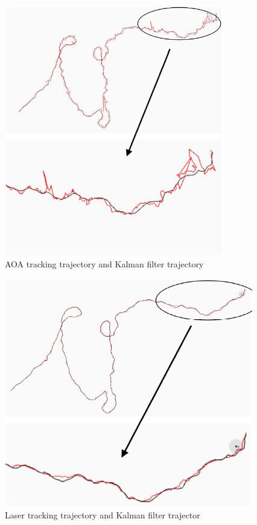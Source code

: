 \begin{figure}[h]
  \begin{center}
  \includegraphics[height=110mm,clip]{figure/2-3_aoa.png}
  \caption{AOA tracking trajectory and Kalman filter trajectory
  \cite{A Robust Autonomous Following Method for Mobile Robots in Dynamic Environments}}
  \label{2-3_aoa}
  \end{center}
\end{figure}

\begin{figure}[h]
  \begin{center}
  \includegraphics[height=100mm,clip]{figure/2-3_laser.png}
  \caption{Laser tracking trajectory and Kalman filter trajector
  \cite{A Robust Autonomous Following Method for Mobile Robots in Dynamic Environments}}
  \label{2-3_laser}
  \end{center}
\end{figure}

